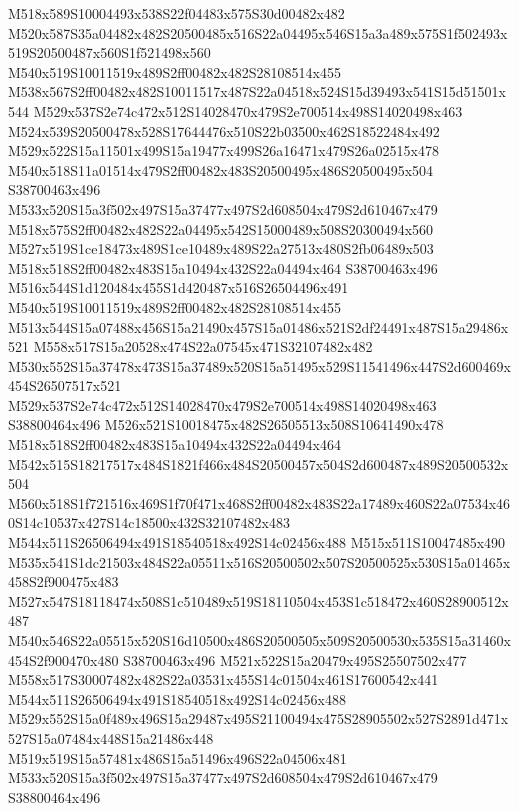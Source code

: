 \documentclass{article}
\begin{document}
\begin{multicols}{2}
M518x589S10004493x538S22f04483x575S30d00482x482 M520x587S35a04482x482S20500485x516S22a04495x546S15a3a489x575S1f502493x519S20500487x560S1f521498x560 M540x519S10011519x489S2ff00482x482S28108514x455 M538x567S2ff00482x482S10011517x487S22a04518x524S15d39493x541S15d51501x544 M529x537S2e74c472x512S14028470x479S2e700514x498S14020498x463 M524x539S20500478x528S17644476x510S22b03500x462S18522484x492 M529x522S15a11501x499S15a19477x499S26a16471x479S26a02515x478 M540x518S11a01514x479S2ff00482x483S20500495x486S20500495x504 S38700463x496 M533x520S15a3f502x497S15a37477x497S2d608504x479S2d610467x479 M518x575S2ff00482x482S22a04495x542S15000489x508S20300494x560 M527x519S1ce18473x489S1ce10489x489S22a27513x480S2fb06489x503 M518x518S2ff00482x483S15a10494x432S22a04494x464 S38700463x496 M516x544S1d120484x455S1d420487x516S26504496x491 M540x519S10011519x489S2ff00482x482S28108514x455 M513x544S15a07488x456S15a21490x457S15a01486x521S2df24491x487S15a29486x521 M558x517S15a20528x474S22a07545x471S32107482x482 M530x552S15a37478x473S15a37489x520S15a51495x529S11541496x447S2d600469x454S26507517x521 M529x537S2e74c472x512S14028470x479S2e700514x498S14020498x463 S38800464x496 M526x521S10018475x482S26505513x508S10641490x478 M518x518S2ff00482x483S15a10494x432S22a04494x464 M542x515S18217517x484S1821f466x484S20500457x504S2d600487x489S20500532x504 M560x518S1f721516x469S1f70f471x468S2ff00482x483S22a17489x460S22a07534x460S14c10537x427S14c18500x432S32107482x483 M544x511S26506494x491S18540518x492S14c02456x488 M515x511S10047485x490 M535x541S1dc21503x484S22a05511x516S20500502x507S20500525x530S15a01465x458S2f900475x483 M527x547S18118474x508S1c510489x519S18110504x453S1c518472x460S28900512x487 M540x546S22a05515x520S16d10500x486S20500505x509S20500530x535S15a31460x454S2f900470x480 S38700463x496 M521x522S15a20479x495S25507502x477 M558x517S30007482x482S22a03531x455S14c01504x461S17600542x441 M544x511S26506494x491S18540518x492S14c02456x488 M529x552S15a0f489x496S15a29487x495S21100494x475S28905502x527S2891d471x527S15a07484x448S15a21486x448 M519x519S15a57481x486S15a51496x496S22a04506x481 M533x520S15a3f502x497S15a37477x497S2d608504x479S2d610467x479 S38800464x496




\end{multicols}
\end{document}
